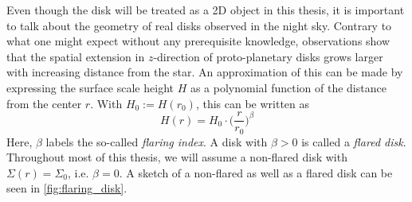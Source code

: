     Even though the disk will be treated as a 2D object in this thesis,
    it is important to talk about the geometry of real disks observed in 
    the night sky. Contrary to what one might expect without any prerequisite 
    knowledge, observations show that the spatial extension in $z$-direction of 
    proto-planetary disks grows larger with increasing distance from the star.
    An approximation of this can be made by expressing the surface scale height
    $H$ as a polynomial function of the distance from the center $r$. With 
    $H_0:=H(r_0)$, this can be written as
    \begin{equation}
      H(r)=H_0\cdot\bigg(\frac{r}{r_0}\bigg)^{\beta}
      \label{eq:def_surface_scale_height_as_a_fct_of_r}
    \end{equation}
    Here, $\beta$ labels the so-called \textit{flaring index}. A disk with 
    $\beta>0$ is called a \textit{flared disk}. Throughout most of this thesis, 
    we will 
    assume a non-flared disk with $\Sigma(r)=\Sigma_0$, i.e. $\beta=0$.
    A sketch of a non-flared as well as a flared disk can be seen in
    \autoref{fig:flaring_disk}.

